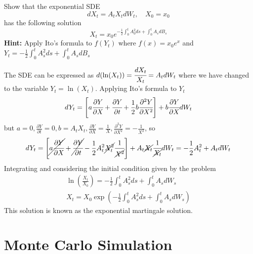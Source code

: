 \documentclass[12pt,a4paper]{book}
\begin{document}
\begin{exercise}[subtitle={Stochastic Differential Equation}, , tags={sde}]
Show that the exponential SDE
\begin{equation*}
	dX_t = A_t X_tdW_t,\quad X_0=x_0
\end{equation*}
has the following solution
\begin{equation*}
	X_t = x_0 e^{-\frac{1}{2}\int_0^t A_0^2 ds+\int_0^t A_s dB_s}
\end{equation*}
\textbf{Hint:} Apply Ito's formula to $f(Y_t)$ where $f(x)=x_0 e^x$ and $Y_t=-\frac{1}{2}\int_0^t A_s^2 ds + \int_0^t A_s dB_s$
\end{exercise}
\begin{solution}
	The SDE can be expressed as $d(\ln(X_t)) = \cfrac{dX_t}{X_t} = A_t dW_t$ where we have changed to the variable $Y_t = \ln(X_t)$. Applying Ito's formula to $Y_t$ 
	\begin{equation*}
		dY_t = \left[a\cfrac{\partial Y}{\partial X} + \cfrac{\partial Y}{\partial t} + \frac{1}{2}b\cfrac{\partial^2 Y}{\partial X^2}\right]+ b\cfrac{\partial Y}{\partial X}dW_t
	\end{equation*}
	but $a=0, \frac{\partial Y}{\partial t}=0, b=A_tX_t, \frac{\partial Y}{\partial X}=\frac{1}{X}, \frac{\partial^2 Y}{\partial X^2}=-\frac{1}{X^2}$, so
	\begin{equation*}
		dY_t = \left[\cancel{a\cfrac{\partial Y}{\partial X}} + \cancel{\cfrac{\partial Y}{\partial t}} - \frac{1}{2}A_t^2 \cancel{X_t^2}\cfrac{1}{\cancel{X^2}}\right]+ A_t\cancel{X_t}\cfrac{1}{\cancel{X_t}}dW_t = -\frac{1}{2}A_t^2 + A_t dW_t
	\end{equation*}
	Integrating and considering the initial condition given by the problem
	\begin{equation*}
		\begin{gathered}
			\ln\left(\frac{X_t}{X_0}\right) = -\frac{1}{2}\int_0^t A_s^2 ds + \int_0^tA_s dW_s \\
			X_t = X_0 \exp\left(-\frac{1}{2}\int_0^t A_s^2 ds + \int_0^tA_s dW_s \right)
		\end{gathered}
	\end{equation*}
This solution is known as the exponential martingale solution.
\end{solution}


\chapter{Monte Carlo Simulation}
\end{document}
